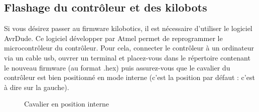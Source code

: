 \documentclass[a4paper,8pt]{report}
\begin{document}
\begin{center}
\end{center}

\subsection*{Flashage du contr\^oleur et des kilobots}\label{sec:name}

Si vous d\'esirez passer au firmware kilobotics, il est n\'ecessaire d'utiliser le logiciel AvrDude. Ce logiciel d\'evelopper par Atmel permet de reprogrammer le microcontr\^oleur du contr\^oleur. Pour cela, connecter le contr\^oleur \`a un ordinateur via un cable usb, ouvrer un terminal et placez-vous dans le r\'epertoire contenant le nouveau firmware (au format .hex) puis assurez-vous que le cavalier du contr\^oleur est bien positionn\'e en mode interne (c'est la position par d\'efaut : c'est \`a dire sur la gauche). \\

\begin{figure}[!h]
    \centering
    \caption{Cavalier en position interne}
\end{figure}
\end{document}
